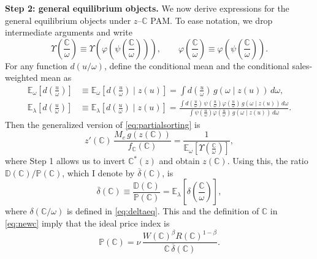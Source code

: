 \noindent \textbf{Step 2: general equilibrium objects.} We now derive expressions for the general equilibrium objects under $z$–$\mathbb{C}$ PAM. To ease notation, we drop intermediate arguments and write
\[
    \Upsilon\!\left(\frac{\mathbb{C}}{\omega}\right) \equiv \Upsilon\!\left(\varphi\!\left(\psi\!\left(\frac{\mathbb{C}}{\omega}\right)\right)\right), 
    \qquad 
    \varphi\!\left(\frac{\mathbb{C}}{\omega}\right) \equiv \varphi\!\left(\psi\!\left(\frac{\mathbb{C}}{\omega}\right)\right).
\]
For any function $d(u/\omega)$, define the conditional mean and the conditional sales-weighted mean as
\begin{align*}
    \mathbb{E}_{\omega}\!\left[d\!\left(\frac{u}{\omega}\right)\right] 
    &\equiv \mathbb{E}_{\omega}\!\left[d\!\left(\frac{u}{\omega}\right) \mid z(u) \right] 
    = \int d\!\left(\frac{u}{\omega}\right)\, g\!\left(\omega \mid z(u)\right)\, d\omega, \\
    \mathbb{E}_{\lambda}\!\left[d\!\left(\frac{u}{\omega}\right)\right] 
    &\equiv \mathbb{E}_{\lambda}\!\left[d\!\left(\frac{u}{\omega}\right) \mid z(u) \right] 
    = \frac{\int d\!\left(\frac{u}{\omega}\right)\, \psi\!\left(\frac{u}{\omega}\right) \varphi\!\left(\frac{u}{\omega}\right)\, g\!\left(\omega \mid z(u)\right)\, d\omega}{\int \psi\!\left(\frac{u}{\omega}\right) \varphi\!\left(\frac{u}{\omega}\right)\, g\!\left(\omega \mid z(u)\right)\, d\omega}.
\end{align*}
Then the generalized version of \eqref{eq:partialsorting} is
\begin{equation}\label{eq:partialsortingext}
	z'(\mathbb{C})\, \frac{M_e\, g(z(\mathbb{C}))}{f_{\mathbb{C}}(\mathbb{C})}
    = \frac{1}{\mathbb{E}_{\omega}\!\left[\Upsilon\!\left(\frac{\mathbb{C}}{\omega}\right)\right]},
\end{equation}
where Step 1 allows us to invert $\mathbb{C}^*(z)$ and obtain $z(\mathbb{C})$. Using this, the ratio $\mathbb{D}(\mathbb{C})/\mathbb{P}(\mathbb{C})$, which I denote by $\overline{\delta}(\mathbb{C})$, is
\begin{equation*}
    \overline{\delta}(\mathbb{C}) \equiv \frac{\mathbb{D}(\mathbb{C})}{\mathbb{P}(\mathbb{C})}
    = \mathbb{E}_\lambda\!\left[\delta\!\left(\frac{\mathbb{C}}{\omega}\right)\right],
\end{equation*}
where $\delta(\mathbb{C}/\omega)$ is defined in \eqref{eq:deltaeq}. This and the definition of $\mathbb{C}$ in \eqref{eq:newc} imply that the ideal price index is
\begin{equation}\label{eq:pindexextend}
\mathbb{P}(\mathbb{C}) = \nu\, \frac{W(\mathbb{C})^\beta R(\mathbb{C})^{1-\beta}}{\mathbb{C}\, \overline{\delta}(\mathbb{C})}.
\end{equation}

